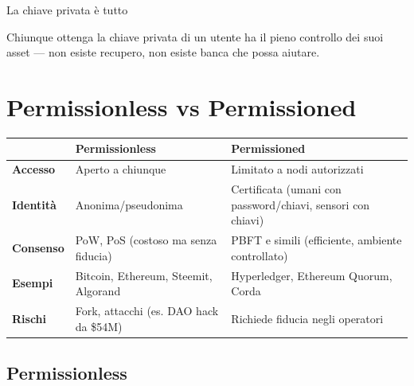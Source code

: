 \documentclass[
  italian,
  openany]{book}
\newcounter{none} %
\begin{document}
\begin{calloutwarning}{La chiave privata è tutto}

Chiunque ottenga la chiave privata di un utente ha il pieno controllo
dei suoi asset --- non esiste recupero, non esiste banca che possa
aiutare.

\end{calloutwarning}

\section{Permissionless vs
Permissioned}\label{permissionless-vs-permissioned}

{\def\LTcaptype{none} %
\begin{longtable}[]{@{}
  >{\raggedright\arraybackslash}p{}
  >{\raggedright\arraybackslash}p{}
  >{\raggedright\arraybackslash}p{}@{}}
\toprule\noalign{}
\begin{minipage}[b]{\linewidth}\raggedright
\end{minipage} & \begin{minipage}[b]{\linewidth}\raggedright
Permissionless
\end{minipage} & \begin{minipage}[b]{\linewidth}\raggedright
Permissioned
\end{minipage} \\
\midrule\noalign{}
\endhead
\bottomrule\noalign{}
\endlastfoot
\textbf{Accesso} & Aperto a chiunque & Limitato a nodi autorizzati \\
\textbf{Identità} & Anonima/pseudonima & Certificata (umani con
password/chiavi, sensori con chiavi) \\
\textbf{Consenso} & PoW, PoS (costoso ma senza fiducia) & PBFT e simili
(efficiente, ambiente controllato) \\
\textbf{Esempi} & Bitcoin, Ethereum, Steemit, Algorand & Hyperledger,
Ethereum Quorum, Corda \\
\textbf{Rischi} & Fork, attacchi (es. DAO hack da \$54M) & Richiede
fiducia negli operatori \\
\end{longtable}
}

\subsection{Permissionless}\label{permissionless}
\end{document}
